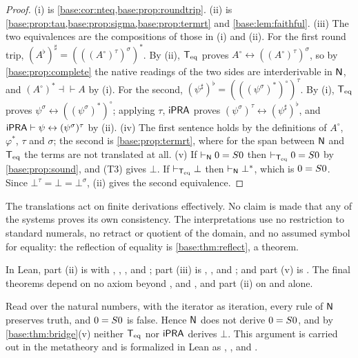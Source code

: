 \begin{proof}
(i) is \cref{base:cor:nteq,base:prop:roundtrip}.  (ii) is
\cref{base:prop:tau,base:prop:sigma,base:prop:termrt} and
\cref{base:lem:faithful}.  (iii) The two equivalences are the compositions
of those in (i) and (ii).  For the first round trip,
$(A^{\flat})^{\sharp}=(((A^\circ)^{\tau})^{\sigma})^{*}$.  By (ii),
$\mathsf{T}_{\mathrm{eq}}$ proves $A^\circ\leftrightarrow((A^\circ)^{\tau})^{\sigma}$, so by
\cref{base:prop:complete} the native readings of the two sides are
interderivable in $\mathsf{N}$, and $(A^\circ)^{*}\dashv\vdash A$ by (i).  For the
second, $(\psi^{\sharp})^{\flat}=(((\psi^{\sigma})^{*})^\circ)^{\tau}$.  By
(i), $\mathsf{T}_{\mathrm{eq}}$ proves
$\psi^{\sigma}\leftrightarrow((\psi^{\sigma})^{*})^\circ$; applying $\tau$,
$\mathsf{iPRA}$ proves
$(\psi^{\sigma})^{\tau}\leftrightarrow(\psi^{\sharp})^{\flat}$, and
$\mathsf{iPRA}\vdash\psi\leftrightarrow(\psi^{\sigma})^{\tau}$ by (ii).
(iv) The first sentence holds by the definitions of $A^\circ$,
$\varphi^{*}$, $\tau$ and $\sigma$; the second is
\cref{base:prop:termrt}, where for the span between $\mathsf{N}$ and $\mathsf{T}_{\mathrm{eq}}$ the
terms are not translated at all.
(v) If $\vdash_{\mathsf{N}}0=S 0$ then $\vdash_{\mathsf{T}_{\mathrm{eq}}}0=S 0$ by
\cref{base:prop:sound}, and (T3) gives $\bot$.  If $\vdash_{\mathsf{T}_{\mathrm{eq}}}\bot$
then $\vdash_{\mathsf{N}}\bot^{*}$, which is $0=S 0$.  Since
$\bot^{\tau}=\bot=\bot^{\sigma}$, (ii) gives the second equivalence.
\end{proof}

The translations act on finite derivations effectively.  No claim is made
that any of the systems proves its own consistency.  The interpretations use
no restriction to standard numerals, no retract or quotient of the domain,
and no assumed symbol for equality: the reflection of equality is
\cref{base:thm:reflect}, a theorem.

In Lean, part (ii) is  with ,
, ,  and
; part (iii) is ,
,  and
; and part (v) is
.  The final theorems depend on no axiom
beyond ,  and , and
part (ii) on  and  alone.

\begin{remark}[Consistency]
\label{base:rem:consistent}
Read over the natural numbers, with the iterator as iteration, every rule
of $\mathsf{N}$ preserves truth, and $0=S 0$ is false.  Hence $\mathsf{N}$ does not
derive $0=S 0$, and by \cref{base:thm:bridge}(v) neither $\mathsf{T}_{\mathrm{eq}}$ nor
$\mathsf{iPRA}$ derives $\bot$.  This argument is carried out in the metatheory and
is formalized in Lean as , ,
 and .
\end{remark}

